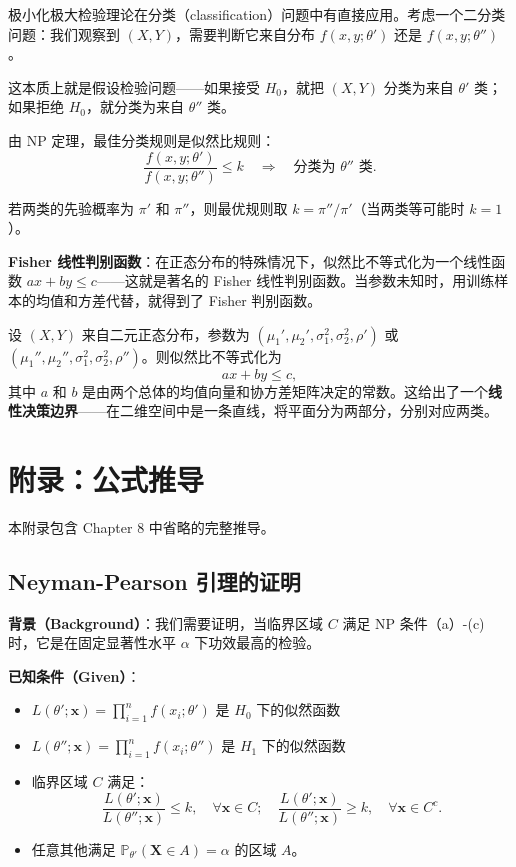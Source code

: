 极小化极大检验理论在分类（classification）问题中有直接应用。考虑一个二分类问题：我们观察到 $(X, Y)$，需要判断它来自分布 $f(x,y;\theta')$ 还是 $f(x,y;\theta'')$。

这本质上就是假设检验问题——如果接受 $H_0$，就把 $(X,Y)$ 分类为来自 $\theta'$ 类；如果拒绝 $H_0$，就分类为来自 $\theta''$ 类。

由 NP 定理，最佳分类规则是似然比规则：
\[
\frac{f(x,y;\theta')}{f(x,y;\theta'')} \leq k \quad \Longrightarrow \quad \text{分类为 $\theta''$ 类}.
\]

若两类的先验概率为 $\pi'$ 和 $\pi''$，则最优规则取 $k = \pi''/\pi'$（当两类等可能时 $k=1$）。

\textbf{Fisher 线性判别函数}：在正态分布的特殊情况下，似然比不等式化为一个线性函数 $ax + by \leq c$——这就是著名的 Fisher 线性判别函数。当参数未知时，用训练样本的均值和方差代替，就得到了 Fisher 判别函数。
\begin{example}[二元正态的线性判别]\label{ex:bivariate-normal-classification}
设 $(X,Y)$ 来自二元正态分布，参数为 $(\mu_1', \mu_2', \sigma_1^2, \sigma_2^2, \rho')$ 或 $(\mu_1'', \mu_2'', \sigma_1^2, \sigma_2^2, \rho'')$。则似然比不等式化为
\[
ax + by \leq c,
\]
其中 $a$ 和 $b$ 是由两个总体的均值向量和协方差矩阵决定的常数。这给出了一个\textbf{线性决策边界}——在二维空间中是一条直线，将平面分为两部分，分别对应两类。\end{example}

\section*{附录：公式推导}\label{sec:appendix-ch8}

本附录包含 Chapter 8 中省略的完整推导。

\subsection{Neyman-Pearson 引理的证明}\label{sec:np-lemma-proof}

\textbf{背景（Background）}：我们需要证明，当临界区域 $C$ 满足 NP 条件（a）-(c) 时，它是在固定显著性水平 $\alpha$ 下功效最高的检验。

\textbf{已知条件（Given）}：
\begin{itemize}
\item $L(\theta'; \mathbf{x}) = \prod_{i=1}^n f(x_i; \theta')$ 是 $H_0$ 下的似然函数
\item $L(\theta''; \mathbf{x}) = \prod_{i=1}^n f(x_i; \theta'')$ 是 $H_1$ 下的似然函数
\item 临界区域 $C$ 满足：
\[
\frac{L(\theta';\mathbf{x})}{L(\theta'';\mathbf{x})} \leq k, \quad \forall \mathbf{x} \in C;
\quad
\frac{L(\theta';\mathbf{x})}{L(\theta'';\mathbf{x})} \geq k, \quad \forall \mathbf{x} \in C^c.
\]
\item 任意其他满足 $\mathbb{P}_{\theta'}(\mathbf{X} \in A) = \alpha$ 的区域 $A$。
\end{itemize}

